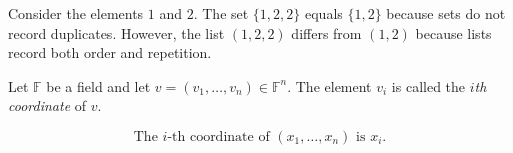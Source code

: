 \begin{example}
Consider the elements $1$ and $2$.
The set $\{1,2,2\}$ equals $\{1,2\}$ because sets do not record duplicates.
However, the list $(1,2,2)$ differs from $(1,2)$ because lists record both
order and repetition.
\end{example}

\begin{definition}[Coordinate]
\label{def:coordinate}
Let $\mathbb{F}$ be a field and let $v = (v_1,\dots,v_n) \in \mathbb{F}^n$.
The element $v_i$ is called the \emph{$i$th coordinate} of $v$.
\end{definition}

\begin{remark*}
\[ \text{The }i\text{-th coordinate of }(x_1,\ldots,x_n)\text{ is }x_i. \]
\end{remark*}

\begin{remark*}[Flash]
\end{remark*}